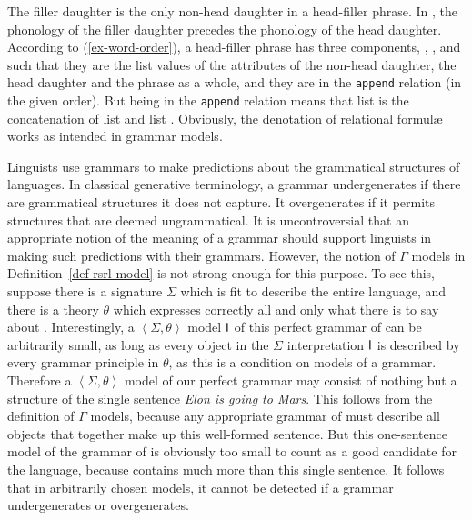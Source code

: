 \documentclass[output=paper,biblatex,babelshorthands,newtxmath,draftmode,colorlinks,citecolor=brown]{langscibook}
\begin{document}
{\largerpage
The filler daughter is the only non-head daughter in a head-filler phrase.
In , the phonology of the filler daughter precedes the phonology
of the head daughter. According to (\ref{ex-word-order}), a head-filler
phrase has three components, , , and  such that
they are the list values of the  attributes of the
non-head daughter, the head daughter and the phrase as a whole, and they
are in the \texttt{append} relation (in the given order). But being in the
\texttt{append} relation means that list  is the concatenation
of list  and list . Obviously, the denotation of relational
formulæ works as intended in grammar models.



Linguists use grammars to make predictions about the grammatical
structures of languages. In classical generative terminology, a
grammar undergenerates if there are grammatical structures it does not
capture. It overgenerates if it permits structures that are deemed
ungrammatical. It is uncontroversial that an appropriate notion of the
meaning of a grammar should support linguists in making such
predictions with their grammars. However, the notion of $\Gamma$
models in Definition~\ref{def-rsrl-model} is not strong enough for
this purpose. To see this, suppose there is a signature $\Sigma$ which
is fit to describe the entire  language, and there is a theory
$\theta$ which expresses correctly all and only what there is to say
about .  Interestingly, a $\left< \Sigma, \theta \right>$ model
$\mathsf{I}$ of this perfect grammar of  can be arbitrarily small, as
long as every object in the $\Sigma$ interpretation $\mathsf{I}$ is
described by every grammar principle in $\theta$, as this is a condition
on models of a grammar. Therefore a $\left< \Sigma, \theta \right>$
model of our perfect grammar may consist of nothing but a structure of
the single sentence \emph{Elon is going to Mars}. This follows from
the definition of $\Gamma$ models, because any appropriate grammar of
 must describe all objects that together make up this
well-formed sentence.  But this one-sentence model of the grammar of
 is obviously too small to count as a good candidate for
the  language, because  contains much more than this
single sentence. It follows that in arbitrarily chosen models, it
cannot be detected if a grammar undergenerates or overgenerates.


}
\end{document}
